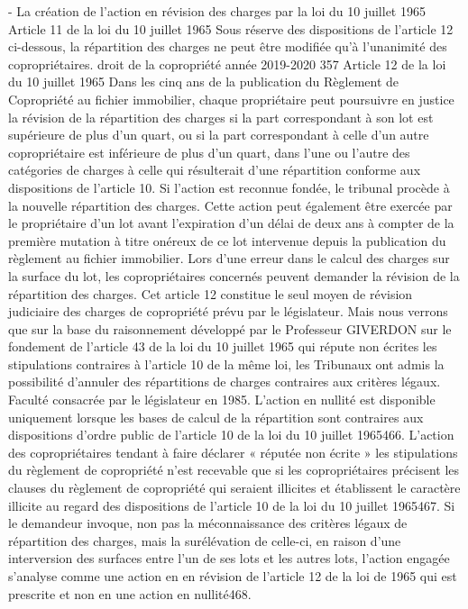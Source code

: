 - La création de l’action en révision des charges par la loi du 10 juillet 1965
Article 11 de la loi du 10 juillet 1965
Sous réserve des dispositions de l'article 12 ci-dessous, la répartition des charges ne peut être modifiée qu'à l'unanimité des copropriétaires.
droit de la copropriété année 2019-2020
357
Article 12 de la loi du 10 juillet 1965
Dans les cinq ans de la publication du Règlement de Copropriété au fichier immobilier, chaque propriétaire peut poursuivre en justice la révision de la répartition des charges si la part correspondant à son lot est supérieure de plus d'un quart, ou si la part correspondant à celle d'un autre copropriétaire est inférieure de plus d'un quart, dans l'une ou l'autre des catégories de charges à celle qui résulterait d'une répartition conforme aux dispositions de l'article 10. Si l'action est reconnue fondée, le tribunal procède à la nouvelle répartition des charges.
Cette action peut également être exercée par le propriétaire d'un lot avant l'expiration d'un délai de deux ans à compter de la première mutation à titre onéreux de ce lot intervenue depuis la publication du règlement au fichier immobilier.
Lors d’une erreur dans le calcul des charges sur la surface du lot, les copropriétaires concernés peuvent demander la révision de la répartition des charges.
Cet article 12 constitue le seul moyen de révision judiciaire des charges de copropriété prévu par le législateur.
Mais nous verrons que sur la base du raisonnement développé par le Professeur GIVERDON sur le fondement de l’article 43 de la loi du 10 juillet 1965 qui répute non écrites les stipulations contraires à l’article 10 de la même loi, les Tribunaux ont admis la possibilité d’annuler des répartitions de charges contraires aux critères légaux. Faculté consacrée par le législateur en 1985.
L’action en nullité est disponible uniquement lorsque les bases de calcul de la répartition sont contraires aux dispositions d’ordre public de l’article 10 de la loi du 10 juillet 1965466.
L’action des copropriétaires tendant à faire déclarer « réputée non écrite » les stipulations du règlement de copropriété n’est recevable que si les copropriétaires précisent les clauses du règlement de copropriété qui seraient illicites et établissent le caractère illicite au regard des dispositions de l’article 10 de la loi du 10 juillet 1965467.
Si le demandeur invoque, non pas la méconnaissance des critères légaux de répartition des charges, mais la surélévation de celle-ci, en raison d’une interversion des surfaces entre l’un de ses lots et les autres lots, l’action engagée s’analyse comme une action en en révision de l’article 12 de la loi de 1965 qui est prescrite et non en une action en nullité468.

